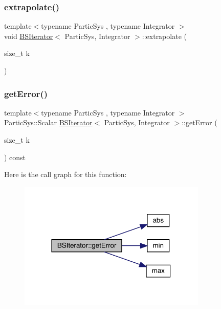\subsubsection{\texorpdfstring{extrapolate()}{extrapolate()}}
{\footnotesize\ttfamily template$<$typename Partic\+Sys , typename Integrator $>$ \\
void \mbox{\hyperlink{class_b_s_iterator}{B\+S\+Iterator}}$<$ Partic\+Sys, Integrator $>$\+::extrapolate (\begin{DoxyParamCaption}\item[{size\+\_\+t}]{k }\end{DoxyParamCaption})\hspace{0.3cm}{\ttfamily [private]}}

\mbox{\label{class_b_s_iterator_a9f50e084f8650e4d7fea3535a0547139}} 
\subsubsection{\texorpdfstring{get\+Error()}{getError()}}
{\footnotesize\ttfamily template$<$typename Partic\+Sys , typename Integrator $>$ \\
Partic\+Sys\+::\+Scalar \mbox{\hyperlink{class_b_s_iterator}{B\+S\+Iterator}}$<$ Partic\+Sys, Integrator $>$\+::get\+Error (\begin{DoxyParamCaption}\item[{size\+\_\+t}]{k }\end{DoxyParamCaption}) const\hspace{0.3cm}{\ttfamily [private]}}

Here is the call graph for this function\+:
\nopagebreak
\begin{figure}[H]
\begin{center}
\leavevmode
\includegraphics[width=254pt]{class_b_s_iterator_a9f50e084f8650e4d7fea3535a0547139_cgraph}
\end{center}
\end{figure}
\mbox{\label{class_b_s_iterator_a9d06a0d0c9e458ea96952b0514adece9}} 
